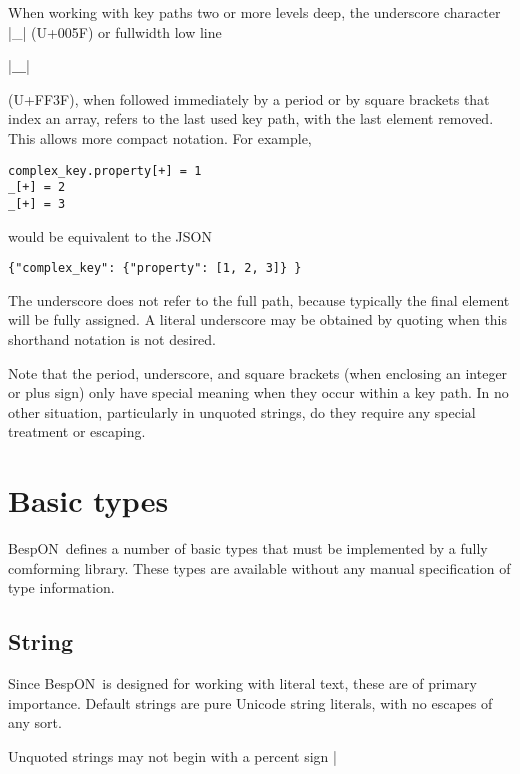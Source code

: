 \documentclass[11pt]{article}
\newcommand{\bespon}{BespON}
\begin{document}
When working with key paths two or more levels deep, the underscore character |_| (U+005F) or fullwidth low line \begin{CJK*}{UTF8}{gkai}|＿|\end{CJK*} (U+FF3F), when followed immediately by a period or by square brackets that index an array, refers to the last used key path, with the last element removed.  This allows more compact notation.  For example,
\begin{Verbatim}
complex_key.property[+] = 1
_[+] = 2
_[+] = 3
\end{Verbatim}
would be equivalent to the JSON
\begin{Verbatim}
{"complex_key": {"property": [1, 2, 3]} }
\end{Verbatim}
The underscore does not refer to the full path, because typically the final element will be fully assigned.  A literal underscore may be obtained by quoting when this shorthand notation is not desired.

Note that the period, underscore, and square brackets (when enclosing an integer or plus sign) only have special meaning when they occur within a key path.  In no other situation, particularly in unquoted strings, do they require any special treatment or escaping.



\section{Basic types}

\bespon\ defines a number of basic types that must be implemented by a fully comforming library.  These types are available without any manual specification of type information.

\subsection{String}

Since \bespon\ is designed for working with literal text, these are of primary importance.  Default strings are pure Unicode string literals, with no escapes of any sort.

Unquoted strings may not begin with a percent sign |%
\end{document}
